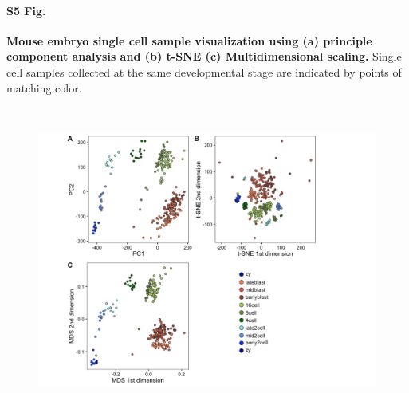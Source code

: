 \documentclass[10pt,letterpaper]{article}
\begin{document}
\paragraph*{S5 Fig.}

\label{figS5}
{\bf Mouse embryo single cell sample visualization using (a) principle component analysis and (b) t-SNE
(c) Multidimensional scaling.}
Single cell samples collected at the same developmental stage are indicated by points of matching color.
\begin{figure}[ht]
\centering
\includegraphics[height=4in, width=6in]{../../src/figure/deng-other-methods.Rmd/deng-with-legend.jpeg}
\end{figure}
\end{document}

